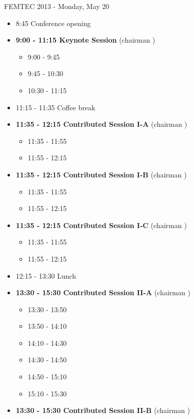 \documentclass[10pt, A4]{article}%
\begin{document}
\centerline{\huge FEMTEC 2013 - Monday, May 20}
\vspace{4mm}

\begin{itemize}    
  \item 8:45 Conference opening
  \item {\bf 9:00 - 11:15 Keynote Session} (chairman ) 
  \begin{itemize}
    \item 9:00 - 9:45
    \item 9:45 - 10:30 
    \item 10:30 - 11:15
  \end{itemize}
  \item 11:15 - 11:35 Coffee break
  \item {\bf 11:35 - 12:15 Contributed Session I-A}  (chairman )
  \begin{itemize}
    \item 11:35 - 11:55 
    \item 11:55 - 12:15 
  \end{itemize}
  \item {\bf 11:35 - 12:15 Contributed Session I-B}  (chairman )
  \begin{itemize}
    \item 11:35 - 11:55 
    \item 11:55 - 12:15 
  \end{itemize}
    \item {\bf 11:35 - 12:15 Contributed Session I-C}  (chairman )
  \begin{itemize}
    \item 11:35 - 11:55 
    \item 11:55 - 12:15 
  \end{itemize}
      \item 12:15 - 13:30 Lunch
  \item {\bf 13:30 - 15:30 Contributed Session II-A} (chairman ) 
  \begin{itemize}
    \item 13:30 - 13:50 
    \item 13:50 - 14:10 
    \item 14:10 - 14:30 
    \item 14:30 - 14:50 
    \item 14:50 - 15:10 
    \item 15:10 - 15:30 
  \end{itemize}
  \item {\bf 13:30 - 15:30 Contributed Session II-B} (chairman ) 
  \begin{itemize}

\end{itemize}
\end{itemize}
\end{document}
